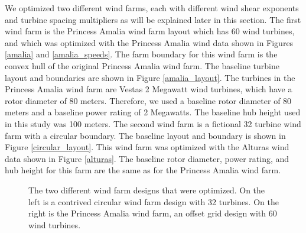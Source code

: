 We optimized two different wind farms, each with different wind shear exponents and turbine spacing multipliers as will be explained later in this section. The first wind farm is the Princess Amalia wind farm layout which has 60 wind turbines, and which was optimized with the Princess Amalia wind data shown in Figures \ref{amalia} and \ref{amalia_speeds}. The farm boundary for this wind farm is the convex hull of the original Princess Amalia wind farm. The baseline turbine layout and boundaries are shown in Figure \ref{amalia_layout}. The turbines in the Princess Amalia wind farm are Vestas 2 Megawatt wind turbines, which have a rotor diameter of 80 meters. Therefore, we used a baseline rotor diameter of 80 meters and a baseline power rating of 2 Megawatts. The baseline hub height used in this study was 100 meters. The second wind farm is a fictional 32 turbine wind farm with a circular boundary. The baseline layout and boundary is shown in Figure \ref{circular_layout}. This wind farm was optimized with the Alturas wind data shown in Figure \ref{alturas}. The baseline rotor diameter, power rating, and hub height for this farm are the same as for the Princess Amalia wind farm. 

\begin{figure}[htbp]
  \centering
  \caption{\label{layouts} The two different wind farm designs that were optimized. On the left is a contrived circular wind farm design with 32 turbines. On the right is the Princess Amalia wind farm, an offset grid design with 60 wind turbines. }
\end{figure}

